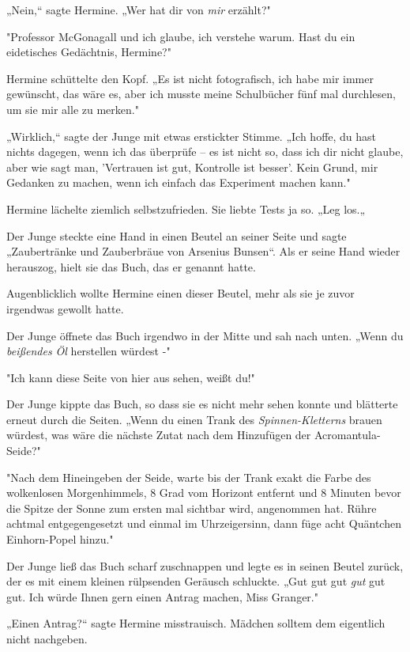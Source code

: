 {„Nein,“ sagte Hermine. „Wer hat dir von \emph{mir} erzählt?"

"Professor McGonagall und ich glaube, ich verstehe warum. Hast du ein eidetisches Gedächtnis, Hermine?"

Hermine schüttelte den Kopf. „Es ist nicht fotografisch, ich habe mir immer gewünscht, das wäre es, aber ich musste meine Schulbücher fünf mal durchlesen, um sie mir alle zu merken."

„Wirklich,“ sagte der Junge mit etwas erstickter Stimme. „Ich hoffe, du hast nichts dagegen, wenn ich das überprüfe -- es ist nicht so, dass ich dir nicht glaube, aber wie sagt man, 'Vertrauen ist gut, Kontrolle ist besser'. Kein Grund, mir Gedanken zu machen, wenn ich einfach das Experiment machen kann."

Hermine lächelte ziemlich selbstzufrieden. Sie liebte Tests ja so. „Leg los.„

Der Junge steckte eine Hand in einen Beutel an seiner Seite und sagte „Zaubertränke und Zauberbräue von Arsenius Bunsen“. Als er seine Hand wieder herauszog, hielt sie das Buch, das er genannt hatte.

Augenblicklich wollte Hermine einen dieser Beutel, mehr als sie je zuvor irgendwas gewollt hatte.

Der Junge öffnete das Buch irgendwo in der Mitte und sah nach unten. „Wenn du \emph{beißendes Öl} herstellen würdest -"

"Ich kann diese Seite von hier aus sehen, weißt du!"

Der Junge kippte das Buch, so dass sie es nicht mehr sehen konnte und blätterte erneut durch die Seiten. „Wenn du einen Trank des \emph{Spinnen-Kletterns} brauen würdest, was wäre die nächste Zutat nach dem Hinzufügen der Acromantula-Seide?"

"Nach dem Hineingeben der Seide, warte bis der Trank exakt die Farbe des wolkenlosen Morgenhimmels, 8 Grad vom Horizont entfernt und 8 Minuten bevor die Spitze der Sonne zum ersten mal sichtbar wird, angenommen hat. Rühre achtmal entgegengesetzt und einmal im Uhrzeigersinn, dann füge acht Quäntchen Einhorn-Popel hinzu."

Der Junge ließ das Buch scharf zuschnappen und legte es in seinen Beutel zurück, der es mit einem kleinen rülpsenden Geräusch schluckte. „Gut gut gut \emph{gut} gut gut. Ich würde Ihnen gern einen Antrag machen, Miss Granger."

„Einen Antrag?“ sagte Hermine misstrauisch. Mädchen solltem dem eigentlich nicht nachgeben.

}
